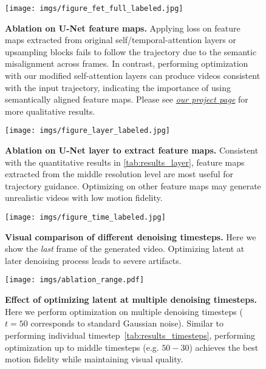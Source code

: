\documentclass{article} \usepackage{iclr2025_conference,times}
\begin{document}
\begin{figure}[!t]
\centering

\texttt{[image: imgs/figure\_fet\_full\_labeled.jpg]}
\caption{\textbf{Ablation on U-Net feature maps.}
Applying loss on feature maps extracted from original self/temporal-attention layers or upsampling blocks fails to follow the trajectory due to the semantic misalignment across frames.
In contrast, performing optimization with our modified self-attention layers can produce videos consistent with the input trajectory, indicating the importance of using semantically aligned feature maps.
Please see \href{https://kmcode1.github.io/Projects/SG-I2V\#ablation-unet-featuremap}{\textit{our project page}} for more qualitative results.}
\label{fig:results_attn}
\end{figure}



\begin{figure}[!t]
\centering
\texttt{[image: imgs/figure\_layer\_labeled.jpg]}
\caption{\textbf{Ablation on U-Net layer to extract feature maps.} Consistent with the quantitative results in \cref{tab:results_layer}, feature maps extracted from the middle resolution level are most useful for trajectory guidance. Optimizing on other feature maps may generate unrealistic videos with low motion fidelity.}
\label{fig:figure_layer}
\end{figure}

\begin{figure}[!t]
\centering
\texttt{[image: imgs/figure\_time\_labeled.jpg]}
\caption{\textbf{Visual comparison of different denoising timesteps.}
Here we show the \emph{last} frame of the generated video. Optimizing latent at later denoising process leads to severe artifacts.
}
\label{fig:results_timesteps}
\end{figure}

\begin{figure}[!t]
\centering
\texttt{[image: imgs/ablation\_range.pdf]}
\caption{\textbf{Effect of optimizing latent at multiple denoising timesteps.}
Here we perform optimization on multiple denoising timesteps ($t=50$ corresponds to standard Gaussian noise).
Similar to performing individual timestep~\cref{tab:results_timesteps},  performing optimization up to middle timesteps (e.g. $50-30$) achieves the best motion fidelity while maintaining visual quality.
}
\label{tab:results_timesteps_range}
\end{figure}
\end{document}

